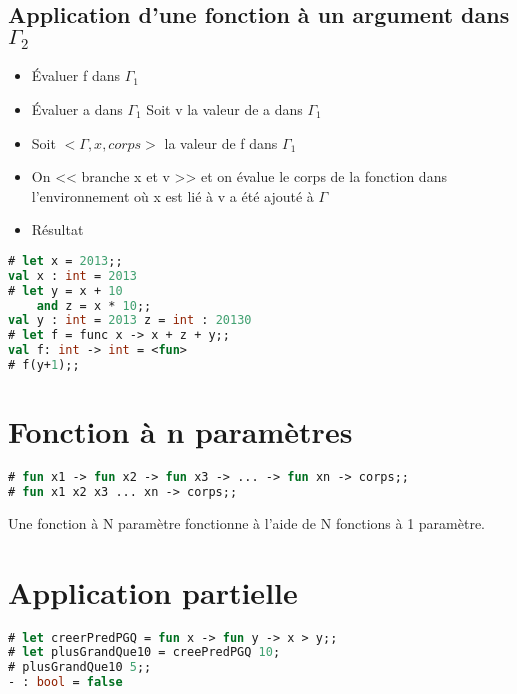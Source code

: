				\subsection{Application d'une fonction à un argument dans $\Gamma_2$}
				\begin{itemize}
					\item Évaluer f dans $\Gamma_1$
					\item Évaluer a dans $\Gamma_1$ Soit v la valeur de a dans $\Gamma_1$
					\item Soit $<\Gamma, x, corps>$ la valeur de f dans $\Gamma_1$
					\item On << branche x et v >> et on évalue le corps de la fonction dans l'environnement où x est lié à v a été ajouté à $\Gamma$
					\item Résultat
				\end{itemize}
			\begin{exemple}
	\begin{lstlisting}[language=Caml, caption=Exemple d'utilisation de fonctions, numbers=none]
# let x = 2013;;
val x : int = 2013
# let y = x + 10
	and z = x * 10;;
val y : int = 2013 z = int : 20130
# let f = func x -> x + z + y;;
val f: int -> int = <fun>
# f(y+1);;
\end{lstlisting}
			\end{exemple}
			\section{Fonction à n paramètres}
	\begin{lstlisting}[language=Caml, caption=Sytaxe d'une définition de fonction à n paramètres, numbers=none]
# fun x1 -> fun x2 -> fun x3 -> ... -> fun xn -> corps;;
# fun x1 x2 x3 ... xn -> corps;;
\end{lstlisting}

Une fonction à N paramètre fonctionne à l'aide de N fonctions à 1 paramètre.  
\section{Application partielle}
	\begin{lstlisting}[language=Caml, caption=Application partielle, numbers=none]
# let creerPredPGQ = fun x -> fun y -> x > y;;
# let plusGrandQue10 = creePredPGQ 10;
# plusGrandQue10 5;;
- : bool = false 
\end{lstlisting}

